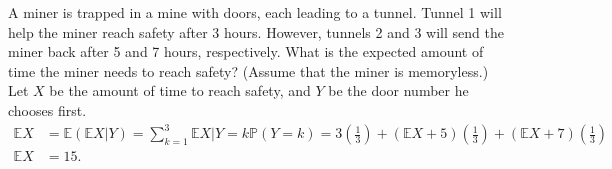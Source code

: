 \documentclass{huhtakm-template-book-v2}
\newcommand{\prob}{\mathbb{P}}
\newcommand{\expect}{\mathbb{E}}
\begin{document}
    \begin{eg}
        A miner is trapped in a mine with doors, each leading to a tunnel. Tunnel 1 will help the miner reach safety after 3 hours. However, tunnels 2 and 3 will send the miner back after 5 and 7 hours, respectively. What is the expected amount of time the miner needs to reach safety? (Assume that the miner is memoryless.)\\
        Let $X$ be the amount of time to reach safety, and $Y$ be the door number he chooses first.
        \begin{align*}
            \expect{X} &= \expect(\expect{X|Y}) = \sum_{k = 1}^{3}\expect{X|Y = k}\prob(Y = k) = 3\left(\frac{1}{3}\right)+(\expect{X}+5)\left(\frac{1}{3}\right)+(\expect{X}+7)\left(\frac{1}{3}\right)\\
            \expect{X} &= 15.
        \end{align*}
    \end{eg}
    \newpage
\end{document}
